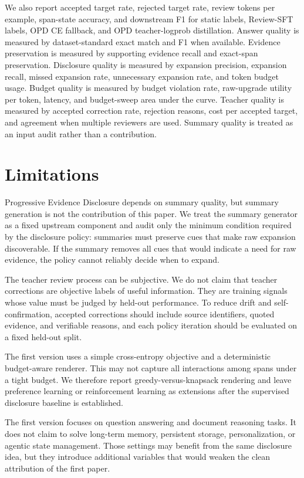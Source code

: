 \documentclass[11pt]{article}
\newcommand{\method}{Progressive Evidence Disclosure}
\begin{document}
We also report accepted target rate, rejected target rate, review tokens per example, span-state accuracy, and downstream F1 for static labels, Review-SFT labels, OPD CE fallback, and OPD teacher-logprob distillation. Answer quality is measured by dataset-standard exact match and F1 when available. Evidence preservation is measured by supporting evidence recall and exact-span preservation. Disclosure quality is measured by expansion precision, expansion recall, missed expansion rate, unnecessary expansion rate, and token budget usage. Budget quality is measured by budget violation rate, raw-upgrade utility per token, latency, and budget-sweep area under the curve. Teacher quality is measured by accepted correction rate, rejection reasons, cost per accepted target, and agreement when multiple reviewers are used. Summary quality is treated as an input audit rather than a contribution.

\section{Limitations}

\method{} depends on summary quality, but summary generation is not the contribution of this paper. We treat the summary generator as a fixed upstream component and audit only the minimum condition required by the disclosure policy: summaries must preserve cues that make raw expansion discoverable. If the summary removes all cues that would indicate a need for raw evidence, the policy cannot reliably decide when to expand.

The teacher review process can be subjective. We do not claim that teacher corrections are objective labels of useful information. They are training signals whose value must be judged by held-out performance. To reduce drift and self-confirmation, accepted corrections should include source identifiers, quoted evidence, and verifiable reasons, and each policy iteration should be evaluated on a fixed held-out split.

The first version uses a simple cross-entropy objective and a deterministic budget-aware renderer. This may not capture all interactions among spans under a tight budget. We therefore report greedy-versus-knapsack rendering and leave preference learning or reinforcement learning as extensions after the supervised disclosure baseline is established.

The first version focuses on question answering and document reasoning tasks. It does not claim to solve long-term memory, persistent storage, personalization, or agentic state management. Those settings may benefit from the same disclosure idea, but they introduce additional variables that would weaken the clean attribution of the first paper.
\end{document}
